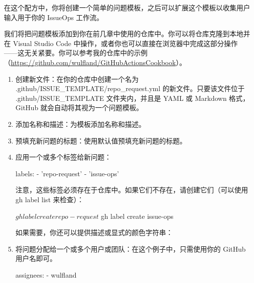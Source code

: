 在这个配方中，你将创建一个简单的问题模板，之后可以扩展这个模板以收集用户输入用于你的 IssueOps 工作流。


我们将把问题模板添加到你在前几章中使用的仓库中。你可以将仓库克隆到本地并在 Visual Studio Code 中操作，或者你也可以直接在浏览器中完成这部分操作——这无关紧要。你可以参考我的仓库中的示例（\url{https://github.com/wulfland/GitHubActionsCookbook}）。


\begin{enumerate}
\item 
创建新文件：在你的仓库中创建一个名为 .github/ISSUE\_TEMPLATE/repo\_request.yml 的新文件。只要该文件位于 .github/ISSUE\_TEMPLATE 文件夹内，并且是 YAML 或 Markdown 格式，GitHub 就会自动将其视为一个问题模板。

\item 
添加名称和描述：为模板添加名称和描述。


\item 
预填充新问题的标题：使用默认值预填充新问题的标题。


\item 
应用一个或多个标签给新问题：

\begin{shell}
labels:
  - 'repo-request'
  - 'issue-ops'
\end{shell}

注意，这些标签必须存在于仓库中。如果它们不存在，请创建它们（可以使用 gh label list 来检查）：

\begin{shell}
$ gh label create repo-request
$ gh label create issue-ops
\end{shell}

如果需要，你还可以提供描述或显式的颜色字符串：


\item 
将问题分配给一个或多个用户或团队：在这个例子中，只需使用你的 GitHub 用户名即可。

\begin{shell}
assignees:
  - wulfland
\end{shell}


\end{enumerate}
